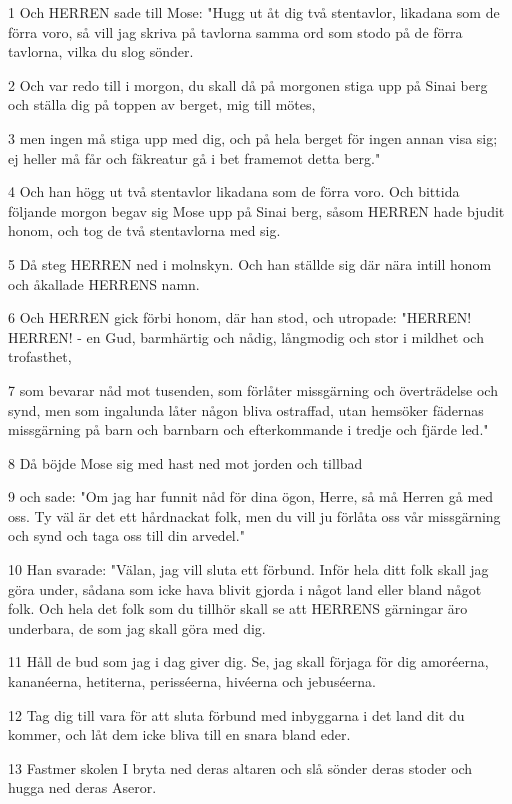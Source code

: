 \par 1 Och HERREN sade till Mose: "Hugg ut åt dig två stentavlor, likadana som de förra voro, så vill jag skriva på tavlorna samma ord som stodo på de förra tavlorna, vilka du slog sönder.
\par 2 Och var redo till i morgon, du skall då på morgonen stiga upp på Sinai berg och ställa dig på toppen av berget, mig till mötes,
\par 3 men ingen må stiga upp med dig, och på hela berget för ingen annan visa sig; ej heller må får och fäkreatur gå i bet framemot detta berg."
\par 4 Och han högg ut två stentavlor likadana som de förra voro. Och bittida följande morgon begav sig Mose upp på Sinai berg, såsom HERREN hade bjudit honom, och tog de två stentavlorna med sig.
\par 5 Då steg HERREN ned i molnskyn. Och han ställde sig där nära intill honom och åkallade HERRENS namn.
\par 6 Och HERREN gick förbi honom, där han stod, och utropade: "HERREN! HERREN! - en Gud, barmhärtig och nådig, långmodig och stor i mildhet och trofasthet,
\par 7 som bevarar nåd mot tusenden, som förlåter missgärning och överträdelse och synd, men som ingalunda låter någon bliva ostraffad, utan hemsöker fädernas missgärning på barn och barnbarn och efterkommande i tredje och fjärde led."
\par 8 Då böjde Mose sig med hast ned mot jorden och tillbad
\par 9 och sade: "Om jag har funnit nåd för dina ögon, Herre, så må Herren gå med oss. Ty väl är det ett hårdnackat folk, men du vill ju förlåta oss vår missgärning och synd och taga oss till din arvedel."
\par 10 Han svarade: "Välan, jag vill sluta ett förbund. Inför hela ditt folk skall jag göra under, sådana som icke hava blivit gjorda i något land eller bland något folk. Och hela det folk som du tillhör skall se att HERRENS gärningar äro underbara, de som jag skall göra med dig.
\par 11 Håll de bud som jag i dag giver dig. Se, jag skall förjaga för dig amoréerna, kananéerna, hetiterna, perisséerna, hivéerna och jebuséerna.
\par 12 Tag dig till vara för att sluta förbund med inbyggarna i det land dit du kommer, och låt dem icke bliva till en snara bland eder.
\par 13 Fastmer skolen I bryta ned deras altaren och slå sönder deras stoder och hugga ned deras Aseror.
